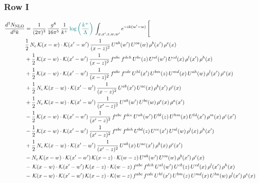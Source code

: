 \documentclass[9pt]{article}
\numberwithin{equation}{section}
\begin{document}
\subsubsection{Row I}
\begin{align}
\frac{d^{3}N_{\mathrm{NLO}}}{d^{3}k} & = \frac{1}{(2\pi)^{3}}\,\frac{g^{4}}{16\pi^{5}}\,\frac{1}{k^{+}}\,{\color{teal}\log{\left(\frac{k^{+}}{\Lambda}\right)}}\,\int_{x,x',z,w,w'}e^{-ik(w'-w)}\,\Bigg[\notag\\ & \frac{1}{2}\,N_{c}\,\mathcal{K}(x-w)\cdot\mathcal{K}(x'-w')\,\frac{1}{(x-z)^{2}}\,U^{ab}(w')\,U^{ca}(w)\,\rho^{b}(x')\,\rho^{c}(x)\notag\\
& +\frac{1}{2}\,\mathcal{K}(x-w)\cdot\mathcal{K}(x'-w')\,\frac{1}{(x-z)^{2}}\,f^{abc}\,f^{deh}\,U^{be}(z)\,U^{al}(w')\,U^{cd}(x)\,\rho^{l}(x')\,\rho^{h}(x)\notag\\
& +\frac{1}{2}\,\mathcal{K}(x-w)\cdot\mathcal{K}(x'-w')\,\frac{1}{(x-z)^{2}}\,f^{abc}\,f^{cde}\,U^{hl}(x')\,U^{bm}(z)\,U^{md}(x)\,U^{ah}(w)\,\rho^{l}(x')\,\rho^{e}(x)\notag\\
& +\frac{1}{2}\,N_{c}\,\mathcal{K}(x-w)\cdot\mathcal{K}(x'-w')\,\frac{1}{(x-z)^{2}}\,U^{ab}(x')\,U^{ac}(x)\,\rho^{b}(x')\,\rho^{c}(x)\notag\\
& +\frac{1}{2}\,N_{c}\,\mathcal{K}(x-w)\cdot\mathcal{K}(x'-w')\,\frac{1}{(x'-z)^{2}}\,U^{ab}(w')\,U^{bc}(w)\,\rho^{c}(x)\,\rho^{a}(x')\notag\\
& -\frac{1}{2}\,\mathcal{K}(x-w)\cdot\mathcal{K}(x'-w')\,\frac{1}{(x'-z)^{2}}\,f^{abc}\,f^{dce}\,U^{ah}(w')\,U^{bl}(z)\,U^{hm}(x)\,U^{ld}(x')\,\rho^{m}(x)\,\rho^{e}(x')\notag\\
& -\frac{1}{2}\,\mathcal{K}(x-w)\cdot\mathcal{K}(x'-w')\,\frac{1}{(x'-z)^{2}}\,f^{abc}\,f^{deh}\,U^{bd}(z)\,U^{ce}(x')\,U^{al}(w)\,\rho^{l}(x)\,\rho^{h}(x')\notag\\
& +\frac{1}{2}\,N_{c}\,\mathcal{K}(x-w)\cdot\mathcal{K}(x'-w')\,\frac{1}{(x'-z)^{2}}\,U^{ab}(x)\,U^{ac}(x')\,\rho^{b}(x)\,\rho^{c}(x')\notag\\
& -N_{c}\,\mathcal{K}(x-w)\cdot\mathcal{K}(x'-w')\,\mathcal{K}(x-z)\cdot\mathcal{K}(w-z)\,U^{ab}(w')\,U^{ca}(w)\,\rho^{b}(x')\,\rho^{c}(x)\notag\\
& -\,\mathcal{K}(x-w)\cdot\mathcal{K}(x'-w')\,\mathcal{K}(x-z)\cdot\mathcal{K}(w-z)\,f^{abc}\,f^{deh}\,U^{al}(w')\,U^{eb}(z)\,U^{cd}(x)\,\rho^{l}(x')\,\rho^{h}(x)\notag\\
& -\,\mathcal{K}(x-w)\cdot\mathcal{K}(x'-w')\,\mathcal{K}(x-z)\cdot\mathcal{K}(w-z)\,f^{abc}\,f^{cde}\,U^{hl}(x')\,U^{bm}(z)\,U^{md}(x)\,U^{ha}(w)\,\rho^{l}(x')\,\rho^{e}(x)\notag\\

\end{align}
\end{document}
